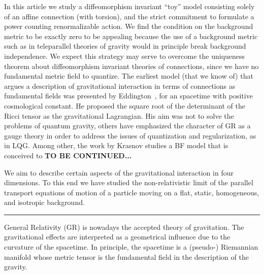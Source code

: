 \documentclass[%
  showpacs,showkeys,prd,superscriptaddress]{revtex4-1}
\begin{document}
In this article we study a diffeomorphism invariant ``toy'' model  consisting  solely of an affine connection  (with torsion), and the strict commitment to formulate a power counting renormalizable action. %
We find the condition on the background metric to be exactly zero to be appealing because the use of a background metric such as in teleparallel theories of gravity would in principle break background independence. %
We expect  this strategy may serve to overcome  the uniqueness theorem about diffeomorphism invariant theories of connections, since we  have no fundamental metric field to quantize. The earliest model (that we know of) that argues  a description of gravitational interaction in terms of connections as fundamental fields  was presented by Eddington~\cite{Eddington1923math}, for an spacetime with positive cosmological constant. He proposed the square root of the determinant of the Ricci tensor as the gravitational Lagrangian. His aim was not to solve the problems of quantum gravity,  others have emphasized the character of GR as a gauge theory in order to address the issues of quantization and regularization, as in LQG. Among other, the work by  Krasnov studies a BF model that is conceived to {\bfseries \color{blue} TO BE CONTINUED...}

We aim to describe certain aspects of the gravitational interaction in four dimensions. To this end we have studied the non-relativistic limit of the parallel transport equations of motion of a particle moving on a flat, static, homogeneous, and isotropic background.

\vspace*{5mm}

\hrule

\vspace*{5mm}

General Relativity (GR) is nowadays the accepted theory of gravitation. The gravitational effects are interpreted as a geometrical influence due to the curvature of the spacetime. In principle, the spacetime is a (pseudo-) Riemannian manifold whose metric tensor is the fundamental field in the description of the gravity.
\end{document}
